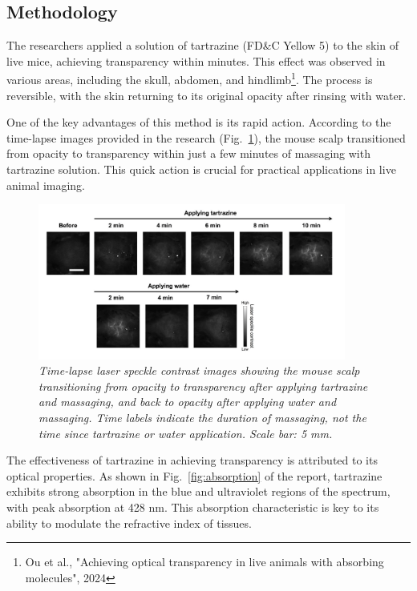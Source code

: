 \documentclass[12pt]{article}
\begin{document}
\subsection{Methodology}
The researchers applied a solution of tartrazine (FD\&C Yellow 5) to the skin of live mice, achieving transparency within minutes. This effect was observed in various areas, including the skull, abdomen, and hindlimb\footnote{Ou et al., "Achieving optical transparency in live animals with absorbing molecules", 2024}. The process is reversible, with the skin returning to its original opacity after rinsing with water. 

One of the key advantages of this method is its rapid action. According to the time-lapse images provided in the research (Fig.~\ref{fig:tartrazine}), the mouse scalp transitioned from opacity to transparency within just a few minutes of massaging with tartrazine solution. This quick action is crucial for practical applications in live animal imaging.

\begin{figure}[H]
    \centering
    \includegraphics[width=0.9\textwidth]{figures/Applying tartrazine.png}
    \caption{\emph{Time-lapse laser speckle contrast images showing the mouse scalp transitioning 
    from opacity to transparency after applying tartrazine and massaging, and back to opacity after 
    applying water and massaging. Time labels indicate the duration of massaging, not the time since 
    tartrazine or water application. Scale bar: 5 mm.}}
    \label{fig:tartrazine}
\end{figure}


The effectiveness of tartrazine in achieving transparency is attributed to its optical properties. As shown in Fig.~\ref{fig:absorption} of the report, tartrazine exhibits strong absorption in the blue and ultraviolet regions of the spectrum, with peak absorption at 428 nm. This absorption characteristic is key to its ability to modulate the refractive index of tissues.
\end{document}
